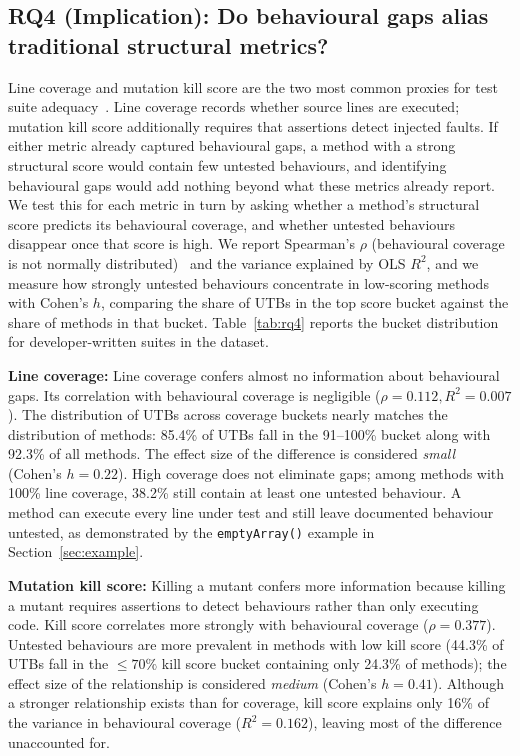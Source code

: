 

\subsection{RQ4 (Implication): Do behavioural gaps alias traditional structural metrics?}
\label{sec:rq4}

Line coverage and mutation kill score are the two most common proxies for test suite adequacy~\cite{PAPADAKIS2019275}. Line coverage records whether source lines are executed; mutation kill score additionally requires that assertions detect injected faults. If either metric already captured behavioural gaps, a method with a strong structural score would contain few untested behaviours, and identifying behavioural gaps would add nothing beyond what these metrics already report. 
We test this for each metric in turn by asking whether a method's structural score predicts its behavioural coverage, and whether untested behaviours disappear once that score is high. We report Spearman's $\rho$ (behavioural coverage is not normally distributed)~\cite{spearman1961proof} and the variance explained by OLS $R^2$, and we measure how strongly untested behaviours concentrate in low-scoring methods with Cohen's $h$, comparing the share of UTBs in the top score bucket against the share of methods in that bucket. Table~\ref{tab:rq4} reports the bucket distribution for developer-written suites in the dataset.


\smallskip
\noindent\textbf{Line coverage:} 
Line coverage confers almost no information about behavioural gaps. 
Its correlation with behavioural coverage is negligible ($\rho=0.112, R^2=0.007$).
The distribution of UTBs across coverage buckets nearly matches the distribution of methods: 85.4\% of UTBs fall in the 91–100\% bucket along with 92.3\% of all methods. 
The effect size of the difference is considered \textit{small} (Cohen's $h=0.22$). 
High coverage does not eliminate gaps; among methods with 100\% line coverage, 38.2\% still contain at least one untested behaviour. 
A method can execute every line under test and still leave documented behaviour untested, as demonstrated by the \texttt{emptyArray()} example in Section~\ref{sec:example}.

\smallskip
\noindent\textbf{Mutation kill score:} 
Killing a mutant confers more information because killing a mutant requires assertions to detect behaviours rather than only executing code. 
Kill score correlates more strongly with behavioural coverage ($\rho=0.377$).
Untested behaviours are more prevalent in methods with low kill score (44.3\% of UTBs fall in the $\leq70\%$ kill score bucket containing only 24.3\% of methods); the effect size of the relationship is considered \textit{medium} (Cohen's $h=0.41$).
Although a stronger relationship exists than for coverage, kill score explains only 16\% of the variance in behavioural coverage ($R^2=0.162$), leaving most of the difference unaccounted for.

